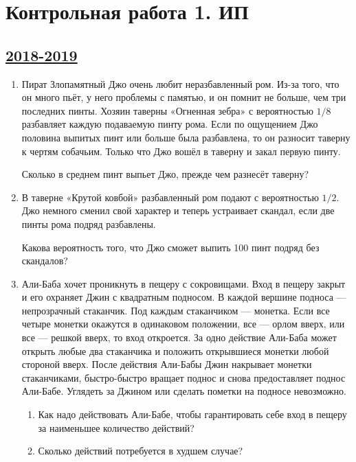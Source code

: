 \newpage
\thispagestyle{empty}
\section{Контрольная работа 1. ИП}

\subsection[2018-2019]{\hyperref[sec:sol_kr_01_ip_2018_2019]{2018-2019}}
\label{sec:kr_01_ip_2018_2019}

\begin{enumerate}
\item Пират Злопамятный Джо очень любит неразбавленный ром. Из-за того,
что он много пьёт, у него проблемы с памятью, и он помнит не больше,
чем три последних пинты. Хозяин таверны «Огненная зебра»
с вероятностью $1/8$ разбавляет каждую подаваемую пинту рома.
Если по ощущением Джо половина выпитых пинт или больше была разбавлена, то он
разносит таверну к чертям собачьим.
Только что Джо вошёл в таверну и закал первую пинту.

Сколько в среднем пинт выпьет Джо, прежде чем разнесёт таверну?

\item В таверне «Крутой ковбой» разбавленный ром подают с вероятностью $1/2$.
Джо немного сменил свой характер и теперь устраивает скандал,
если две пинты рома подряд разбавлены.

Какова вероятность того, что Джо сможет выпить 100 пинт подряд без скандалов?

\item Али-Баба хочет проникнуть в пещеру с сокровищами. Вход в
пещеру закрыт и его охраняет Джин с квадратным подносом.
В каждой вершине подноса — непрозрачный стаканчик. Под
каждым стаканчиком — монетка.
Если все четыре монетки окажутся в одинаковом положении, все —
орлом вверх, или все — решкой вверх, то вход откроется.
За одно действие Али-Баба может открыть любые два стаканчика и
положить открывшиеся монетки любой стороной вверх.
После действия Али-Бабы Джин накрывает монетки стаканчиками,
быстро-быстро вращает поднос и снова предоставляет поднос
Али-Бабе.
Углядеть за Джином или сделать пометки на подносе невозможно.

\begin{enumerate}
  \item Как надо действовать Али-Бабе, чтобы гарантировать себе вход в
  пещеру за наименьшее количество действий?
  \item Сколько действий
  потребуется в худшем случае?
\end{enumerate}


\end{enumerate}
